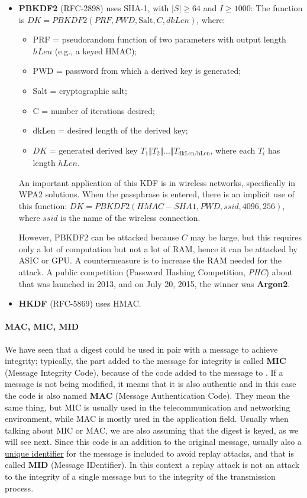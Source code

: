 \begin{itemize}
    \item \textbf{PBKDF2} (RFC-2898) uses SHA-1, with \(|S| \geq 64\) and \(I \geq 1000\):
          The function is \(DK = PBKDF2(PRF, PWD, \text{Salt}, C, dkLen)\), where:
          \begin{itemize}
              \item PRF = pseudorandom function of two parameters with output length \(hLen\) (e.g., a keyed HMAC);
              \item PWD = password from which a derived key is generated;
              \item Salt = cryptographic salt;
              \item C = number of iterations desired;
              \item dkLen = desired length of the derived key;
              \item \(DK\) = generated derived key $T_1 \Vert T_2 \Vert \ldots \Vert T_{\text{dkLen/hLen}}$, where each $T_i$ has length \(hLen\).
          \end{itemize}
          An important application of this KDF is in wireless networks, specifically in WPA2 solutions. When the passphrase is entered, there is an implicit use of this function: $DK = PBKDF2(HMAC-SHA1, PWD, ssid, 4096, 256)$, where \(ssid\) is the name of the wireless connection.

          However, PBKDF2 can be attacked because \(C\) may be large, but this requires only a lot of computation but not a lot of RAM, hence it can be attacked by ASIC or GPU. A countermeasure is to increase the RAM needed for the attack. A public competition (Password Hashing Competition, \textit{PHC}) about that was launched in 2013, and on July 20, 2015, the winner was \textbf{Argon2}.

    \item \textbf{HKDF} (RFC-5869) uses HMAC.
\end{itemize}


\paragraph{MAC, MIC, MID}
We have seen that a digest could be used in pair with a message to achieve integrity; typically, the part added
to the message for integrity is called \textbf{MIC} (Message Integrity Code), because of the code added to the message
to . If a message is not being modified, it means that it is also authentic and in this case the code is also named \textbf{MAC} (Message Authentication Code). They mean the same thing, but MIC is usually used
in the telecommunication and networking environment, while MAC is mostly used in the application field.
Usually when talking about MIC or MAC, we are also assuming that the digest is keyed, as we will see next.
Since this code is an addition to the original message, usually also a \underline{unique identifier} for the message is
included to avoid replay attacks, and that is called \textbf{MID} (Message IDentifier). In this context a replay attack
is not an attack to the integrity of a single message but to the integrity of the transmission process.


